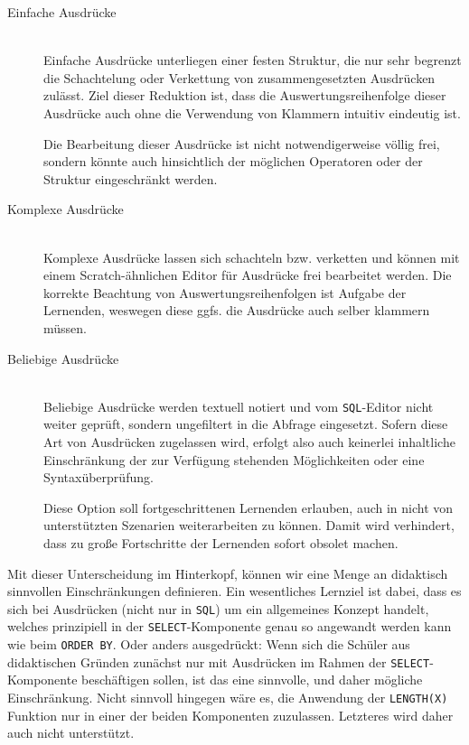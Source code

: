 \begin{description}
\item[Einfache Ausdrücke] \hfill\\
  Einfache Ausdrücke unterliegen einer festen Struktur, die nur sehr begrenzt die Schachtelung oder Verkettung von zusammengesetzten Ausdrücken zulässt. Ziel dieser Reduktion ist, dass die Auswertungsreihenfolge dieser Ausdrücke auch ohne die Verwendung von Klammern intuitiv eindeutig ist.

  Die Bearbeitung dieser Ausdrücke ist nicht notwendigerweise völlig frei, sondern könnte auch hinsichtlich der möglichen Operatoren oder der Struktur eingeschränkt werden.
\item[Komplexe Ausdrücke] \hfill\\
  Komplexe Ausdrücke lassen sich schachteln bzw. verketten und können mit einem Scratch-ähnlichen Editor für Ausdrücke frei bearbeitet werden. Die korrekte Beachtung von Auswertungsreihenfolgen ist Aufgabe der Lernenden, weswegen diese ggfs. die Ausdrücke auch selber klammern müssen.

\item[Beliebige Ausdrücke] \hfill\\
  Beliebige Ausdrücke werden textuell notiert und vom \texttt{SQL}-Editor nicht weiter geprüft, sondern ungefiltert in die Abfrage eingesetzt. Sofern diese Art von Ausdrücken zugelassen wird, erfolgt also auch keinerlei inhaltliche Einschränkung der zur Verfügung stehenden Möglichkeiten oder eine Syntaxüberprüfung.

  Diese Option soll fortgeschrittenen Lernenden erlauben, auch in nicht von \idename{} unterstützten Szenarien weiterarbeiten zu können. Damit wird verhindert, dass zu große Fortschritte der Lernenden \idename{} sofort obsolet machen.
\end{description}

Mit dieser Unterscheidung im Hinterkopf, können wir eine Menge an didaktisch sinnvollen Einschränkungen definieren. Ein wesentliches Lernziel ist dabei, dass es sich bei Ausdrücken (nicht nur in \texttt{SQL}) um ein allgemeines Konzept handelt, welches prinzipiell in der \texttt{SELECT}-Komponente genau so angewandt werden kann wie beim \texttt{ORDER BY}. Oder anders ausgedrückt: Wenn sich die Schüler aus didaktischen Gründen zunächst nur mit Ausdrücken im Rahmen der \texttt{SELECT}-Komponente beschäftigen sollen, ist das eine sinnvolle, und daher mögliche Einschränkung. Nicht sinnvoll hingegen wäre es, die Anwendung der \texttt{LENGTH(X)} Funktion nur in einer der beiden Komponenten zuzulassen. Letzteres wird daher auch nicht unterstützt.


